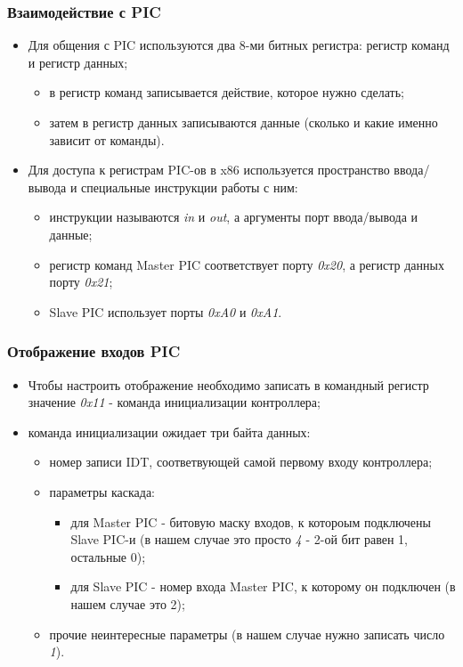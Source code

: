 \begin{frame}
\frametitle{Взаимодействие с PIC}
\begin{itemize}
  \item Для общения с PIC используются два 8-ми битных регистра: регистр команд
  и регистр данных;
  \begin{itemize}
    \item в регистр команд записывается действие, которое нужно сделать;
    \item затем в регистр данных записываются данные (сколько и какие именно
    зависит от команды).
  \end{itemize}
  \item Для доступа к регистрам PIC-ов в x86 используется пространство
  ввода/вывода и специальные инструкции работы с ним:
  \begin{itemize}
    \item инструкции называются \emph{in} и \emph{out}, а аргументы порт
    ввода/вывода и данные;
    \item регистр команд Master PIC соответствует порту \emph{0x20}, а регистр
    данных порту \emph{0x21};
    \item Slave PIC использует порты \emph{0xA0} и \emph{0xA1}.
  \end{itemize}
\end{itemize}
\end{frame}

\begin{frame}
\frametitle{Отображение входов PIC}
\begin{itemize}
  \item Чтобы настроить отображение необходимо записать в командный регистр
  значение \emph{0x11} - команда инициализации контроллера;
  \item команда инициализации ожидает три байта данных:
  \begin{itemize}
    \item номер записи IDT, соответвующей самой первому входу контроллера;
    \item параметры каскада:
    \begin{itemize}
      \item для Master PIC - битовую маску входов, к котороым подключены Slave
      PIC-и (в нашем случае это просто \emph{4} - 2-ой бит равен 1, остальные
      0);
      \item для Slave PIC - номер входа Master PIC, к которому он подключен (в
      нашем случае это 2);
    \end{itemize}
    \item прочие неинтересные параметры (в нашем случае нужно записать число
    \emph{1}).
  \end{itemize}
\end{itemize}
\end{frame}

